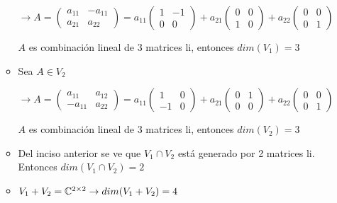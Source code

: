 \begin{enumerate}
\begin{mdframed}[style=s]
\begin{itemize}
\begin{center}
                            $\to A=\begin{pmatrix}
                                a_{11}&-a_{11}\\a_{21}&a_{22}
                            \end{pmatrix}=a_{11}\begin{pmatrix}
                                1&-1\\0&0
                            \end{pmatrix}+a_{21}\begin{pmatrix}
                                0&0\\1&0
                            \end{pmatrix}+a_{22}\begin{pmatrix}
                                0&0\\0&1
                            \end{pmatrix}$        
                        \end{center}
                        $A$ es combinación lineal de 3 matrices li, entonces $dim(V_1)=3$
                    \item Sea $A\in V_2$
                        \begin{center}
                            $\to A=\begin{pmatrix}
                                a_{11}&a_{12}\\-a_{11}&a_{22}
                            \end{pmatrix}=a_{11}\begin{pmatrix}
                                1&0\\-1&0
                            \end{pmatrix}+a_{21}\begin{pmatrix}
                                0&1\\0&0
                            \end{pmatrix}+a_{22}\begin{pmatrix}
                                0&0\\0&1
                            \end{pmatrix}$        
                        \end{center}
                        $A$ es combinación lineal de 3 matrices li, entonces $dim(V_2)=3$
                    \item Del inciso anterior se ve que $V_1\cap V_2$ está generado por 2 matrices li. Entonces $dim(V_1\cap V_2)=2$
                    \item $V_1+V_2=\mathbb{C}^{2\times2}\to dim(V_1+V_2)=4$
                \end{itemize}
            \end{mdframed}
    \end{enumerate}